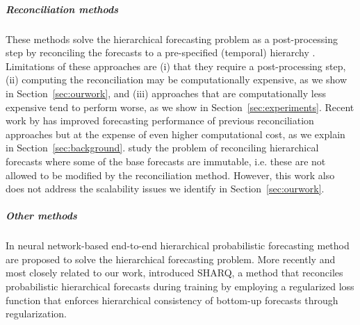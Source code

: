 \documentclass[preprint, 3p, times, twocolumn]{elsarticle}
\begin{document}
\subparagraph{Reconciliation methods} These methods solve the hierarchical forecasting problem as a post-processing step by reconciling the forecasts to a pre-specified (temporal) hierarchy \cite{hyndman_optimal_2011, hyndman_fast_2016, taieb_coherent_2017, bentaieb_regularized_2019, wickramasuriya_optimal_2019, panagiotelis_forecast_2021}. Limitations of these approaches are (i) that they require a post-processing step, (ii) computing the reconciliation may be computationally expensive, as we show in Section~\ref{sec:ourwork}, and (iii) approaches that are computationally less expensive tend to perform worse, as we show in Section~\ref{sec:experiments}. Recent work by \citet{taieb_sparse_2017, bentaieb_regularized_2019} has improved forecasting performance of previous reconciliation approaches but at the expense of even higher computational cost, as we explain in Section~\ref{sec:background}. \citet{zhang_optimal_2023} study the problem of reconciling hierarchical forecasts where some of the base forecasts are immutable, i.e. these are not allowed to be modified by the reconciliation method. However, this work also does not address the scalability issues we identify in Section~\ref{sec:ourwork}.

\subparagraph{Other methods} In \cite{rangapuram_endtoend_2021,rangapuram_coherent_2023} neural network-based end-to-end hierarchical probabilistic forecasting method are proposed to solve the hierarchical forecasting problem. More recently and most closely related to our work, \citet{han_simultaneously_2021} introduced SHARQ, a method that reconciles probabilistic hierarchical forecasts during training by employing a regularized loss function that enforces hierarchical consistency of bottom-up forecasts through regularization.
\end{document}
